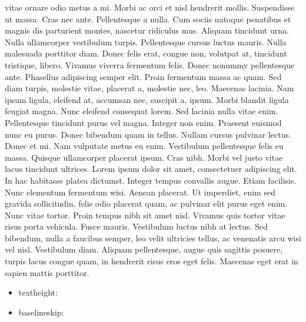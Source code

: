\documentclass[draft,12pt,twoside,a4paper]{book}
\begin{document}
 vitae ornare odio metus a mi.
Morbi ac orci et nisl hendrerit mollis.
Suspendisse ut massa.
Cras nec ante.
Pellentesque a nulla.
Cum sociis natoque penatibus et magnis dis parturient montes,
 nascetur ridiculus mus.
Aliquam tincidunt urna.
Nulla ullamcorper vestibulum turpis.
Pellentesque cursus luctus mauris.
Nulla malesuada porttitor diam.
Donec felis erat, congue non, volutpat at, tincidunt tristique, libero.
Vivamus viverra fermentum felis.
Donec nonummy pellentesque ante.
Phasellus adipiscing semper elit.
Proin fermentum massa ac quam.
Sed diam turpis, molestie vitae, placerat a, molestie nec, leo.
Maecenas lacinia.
Nam ipsum ligula, eleifend at, accumsan nec, suscipit a, ipsum.
Morbi blandit ligula feugiat magna.
Nunc eleifend consequat lorem.
Sed lacinia nulla vitae enim.
Pellentesque tincidunt purus vel magna.
Integer non enim.
Praesent euismod nunc eu purus.
Donec bibendum quam in tellus.
Nullam cursus pulvinar lectus.
Donec et mi.
Nam vulputate metus eu enim.
Vestibulum pellentesque felis eu massa.
Quisque ullamcorper placerat ipsum.
Cras nibh.
Morbi vel justo vitae lacus tincidunt ultrices.
Lorem ipsum dolor sit amet, consectetuer adipiscing elit.
In hac habitasse platea dictumst.
Integer tempus convallis augue.
Etiam facilisis.
Nunc elementum fermentum wisi.
Aenean placerat.
Ut imperdiet, enim sed gravida sollicitudin, felis odio placerat quam,
 ac pulvinar elit purus eget enim.
Nunc vitae tortor.
Proin tempus nibh sit amet nisl.
Vivamus quis tortor vitae risus porta vehicula.
Fusce mauris.
Vestibulum luctus nibh at lectus.
Sed bibendum, nulla a faucibus semper, leo velit ultricies tellus,
 ac venenatis arcu wisi vel nisl.
Vestibulum diam.
Aliquam pellentesque, augue quis sagittis posuere, turpis lacus congue quam,
 in hendrerit risus eros eget felis.
Maecenas eget erat in sapien mattis porttitor.

\begin{itemize}
\item textheight: \the\textheight
\item baselineskip: \the\baselineskip
\end{itemize}

\tableofcontents{}
\end{document}
